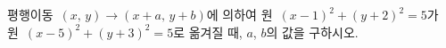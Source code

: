 평행이동~$(x,\,y)\longrightarrow(x+a,\,y+b)$에 의하여 원~$(x-1)^2+(y+2)^2=5$가 원~$(x-5)^2+(y+3)^2=5$로 옮겨질 때, $a$, $b$의 값을 구하시오.
